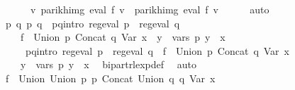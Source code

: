 \begin{isabellebody}
\ \ \ \ \ \ {\isacharparenleft}{\kern0pt}{\isasymforall}v{\isachardot}{\kern0pt}\ parikh{\isacharunderscore}{\kern0pt}img\ {\isacharparenleft}{\kern0pt}eval\ f{}\ v{\isacharparenright}{\kern0pt}\ {\isacharequal}{\kern0pt}\ parikh{\isacharunderscore}{\kern0pt}img\ {\isacharparenleft}{\kern0pt}eval\ f{}{\isacharprime}{\kern0pt}\ v{\isacharparenright}{\kern0pt}{\isacharparenright}{\kern0pt}{\isachardoublequoteclose}\isanewline
\ \ \ \ \isamarkupfalse%
\ auto\isanewline
\ \ \isamarkupfalse%
\ \isamarkupfalse%
\ p{}\ q{}\ p{}\ q{}\ \ p{}{\isacharunderscore}{\kern0pt}q{}{\isacharunderscore}{\kern0pt}intro{\isacharcolon}{\kern0pt}\ {\isachardoublequoteopen}reg{\isacharunderscore}{\kern0pt}eval\ p{}\ {\isasymand}\ reg{\isacharunderscore}{\kern0pt}eval\ q{}\ {\isasymand}\isanewline
\ \ \ \ f{}{\isacharprime}{\kern0pt}\ {\isacharequal}{\kern0pt}\ Union\ p{}\ {\isacharparenleft}{\kern0pt}Concat\ q{}\ {\isacharparenleft}{\kern0pt}Var\ x{\isacharparenright}{\kern0pt}{\isacharparenright}{\kern0pt}\ {\isasymand}\ {\isacharparenleft}{\kern0pt}{\isasymforall}y\ {\isasymin}\ vars\ p{}{\isachardot}{\kern0pt}\ y\ {\isasymnoteq}\ x{\isacharparenright}{\kern0pt}{\isachardoublequoteclose}\isanewline
\ \ \ \ \ p{}{\isacharunderscore}{\kern0pt}q{}{\isacharunderscore}{\kern0pt}intro{\isacharcolon}{\kern0pt}\ {\isachardoublequoteopen}reg{\isacharunderscore}{\kern0pt}eval\ p{}\ {\isasymand}\ reg{\isacharunderscore}{\kern0pt}eval\ q{}\ {\isasymand}\ f{}{\isacharprime}{\kern0pt}\ {\isacharequal}{\kern0pt}\ Union\ p{}\ {\isacharparenleft}{\kern0pt}Concat\ q{}\ {\isacharparenleft}{\kern0pt}Var\ x{\isacharparenright}{\kern0pt}{\isacharparenright}{\kern0pt}\ {\isasymand}\isanewline
\ \ \ \ {\isacharparenleft}{\kern0pt}{\isasymforall}y\ {\isasymin}\ vars\ p{}{\isachardot}{\kern0pt}\ y\ {\isasymnoteq}\ x{\isacharparenright}{\kern0pt}{\isachardoublequoteclose}\ \isamarkupfalse%
\ bipart{\isacharunderscore}{\kern0pt}rlexp{\isacharunderscore}{\kern0pt}def\ \isamarkupfalse%
\ auto\isanewline
\isanewline
\ \ \isamarkupfalse%
\ {\isacharquery}{\kern0pt}f{\isacharprime}{\kern0pt}\ {\isacharequal}{\kern0pt}\ {\isachardoublequoteopen}Union\ {\isacharparenleft}{\kern0pt}Union\ p{}\ p{}{\isacharparenright}{\kern0pt}\ {\isacharparenleft}{\kern0pt}Concat\ {\isacharparenleft}{\kern0pt}Union\ q{}\ q{}{\isacharparenright}{\kern0pt}\ {\isacharparenleft}{\kern0pt}Var\ x{\isacharparenright}{\kern0pt}{\isacharparenright}{\kern0pt}{\isachardoublequoteclose}\isanewline

\end{isabellebody}
